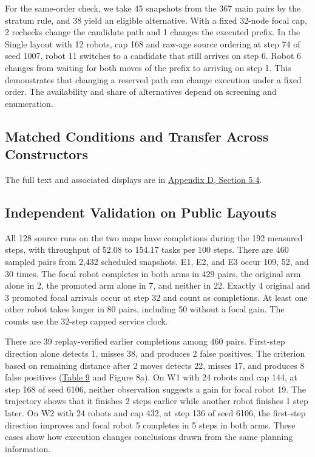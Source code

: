 \documentclass{article}
\begin{document}
For the same-order check, we take 45 snapshots from the 367 main pairs by the stratum rule, and 38 yield an eligible alternative. With a fixed 32-node focal cap, 2 rechecks change the candidate path and 1 changes the executed prefix. In the Single layout with 12 robots, cap 168 and raw-age source ordering at step 74 of seed 1007, robot 11 switches to a candidate that still arrives on step 6. Robot 6 changes from waiting for both moves of the prefix to arriving on step 1. This demonstrates that changing a reserved path can change execution under a fixed order. The availability and share of alternatives depend on screening and enumeration.

\subsection{Matched Conditions and Transfer Across Constructors}
The full text and associated displays are in \hyperlink{sup:5.4}{Appendix D, Section 5.4}.

\subsection{Independent Validation on Public Layouts}
All 128 source runs on the two maps have completions during the 192 measured steps, with throughput of 52.08 to 154.17 tasks per 100 steps. There are 460 sampled pairs from 2,432 scheduled snapshots. E1, E2, and E3 occur 109, 52, and 30 times. The focal robot completes in both arms in 429 pairs, the original arm alone in 2, the promoted arm alone in 7, and neither in 22. Exactly 4 original and 3 promoted focal arrivals occur at step 32 and count as completions. At least one other robot takes longer in 80 pairs, including 50 without a focal gain. The counts use the 32-step capped service clock.

There are 39 replay-verified earlier completions among 460 pairs. First-step direction alone detects 1, misses 38, and produces 2 false positives. The criterion based on remaining distance after 2 moves detects 22, misses 17, and produces 8 false positives (\hyperlink{display:Table9}{Table 9} and Figure 8a). On W1 with 24 robots and cap 144, at step 168 of seed 6106, neither observation suggests a gain for focal robot 19. The trajectory shows that it finishes 2 steps earlier while another robot finishes 1 step later. On W2 with 24 robots and cap 432, at step 136 of seed 6106, the first-step direction improves and focal robot 5 completes in 5 steps in both arms. These cases show how execution changes conclusions drawn from the same planning information.
\end{document}
